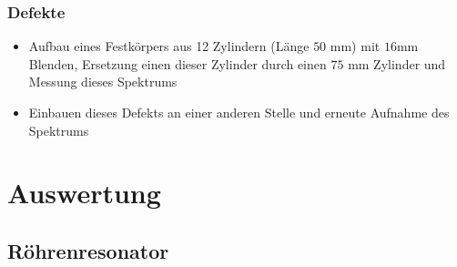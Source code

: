 \documentclass[german,  %
parskip=full,  %
]{scrartcl}
\begin{document}
\subsubsection{Defekte}
\begin{itemize}
\item Aufbau eines Festkörpers aus 12 Zylindern (Länge $50$ mm) mit $16$mm Blenden, Ersetzung einen dieser Zylinder durch einen $75$ mm Zylinder und Messung dieses Spektrums
\item Einbauen dieses Defekts an einer anderen Stelle und erneute Aufnahme des Spektrums
\end{itemize}

\section{Auswertung}
\subsection{Röhrenresonator}
\end{document}
